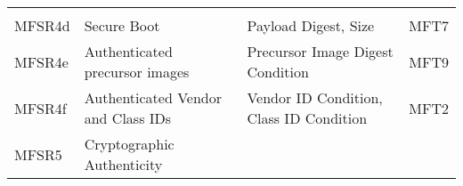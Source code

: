 \documentclass[0-thesis.tex]{subfiles}
\begin{document}
\begin{longtable}[]{@{}llll@{}}
\begin{minipage}[t]{0.10\columnwidth}
    \end{minipage}\tabularnewline
    \begin{minipage}[t]{0.16\columnwidth}\raggedright\strut MFSR4d\strut \end{minipage} &
    \begin{minipage}[t]{0.29\columnwidth}\raggedright\strut Secure Boot\strut
    \end{minipage} & \begin{minipage}[t]{0.34\columnwidth}\raggedright\strut Payload
    Digest, Size\strut \end{minipage} &
    \begin{minipage}[t]{0.10\columnwidth}\raggedright\strut MFT7\strut
    \end{minipage}\tabularnewline
    \begin{minipage}[t]{0.16\columnwidth}\raggedright\strut MFSR4e\strut \end{minipage} &
    \begin{minipage}[t]{0.29\columnwidth}\raggedright\strut Authenticated precursor
    images\strut \end{minipage} & \begin{minipage}[t]{0.34\columnwidth}\raggedright\strut
    Precursor Image Digest Condition\strut \end{minipage} &
    \begin{minipage}[t]{0.10\columnwidth}\raggedright\strut MFT9\strut
    \end{minipage}\tabularnewline
    \begin{minipage}[t]{0.16\columnwidth}\raggedright\strut MFSR4f\strut \end{minipage} &
    \begin{minipage}[t]{0.29\columnwidth}\raggedright\strut Authenticated Vendor and Class
    IDs\strut \end{minipage} & \begin{minipage}[t]{0.34\columnwidth}\raggedright\strut
    Vendor ID Condition, Class ID Condition\strut \end{minipage} &
    \begin{minipage}[t]{0.10\columnwidth}\raggedright\strut MFT2\strut
    \end{minipage}\tabularnewline
    \begin{minipage}[t]{0.16\columnwidth}\raggedright\strut MFSR5\strut \end{minipage} &
    \begin{minipage}[t]{0.29\columnwidth}\raggedright\strut Cryptographic
    Authenticity\strut \end{minipage} &

\end{longtable}
\end{document}
